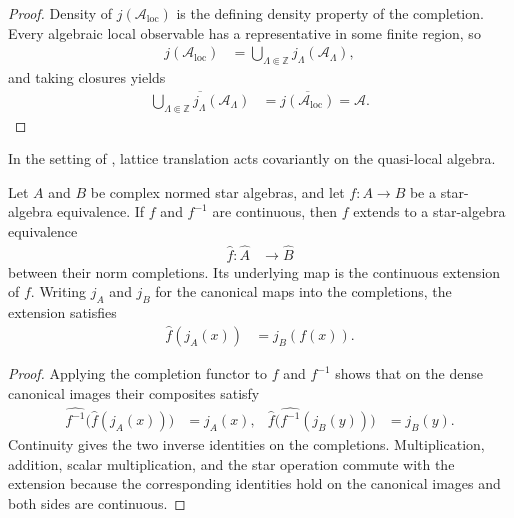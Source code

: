 \begin{proof}\leanok
    Density of $j(\mathcal A_{\mathrm{loc}})$ is the defining density property
    of the completion.  Every algebraic local observable has a representative
    in some finite region, so
    \begin{align}
        j(\mathcal A_{\mathrm{loc}})
         & =\bigcup_{\Lambda\Subset\mathbb Z}j_\Lambda(\mathcal A_\Lambda),
    \end{align}
    and taking closures yields
    \begin{align}
        \overline{\bigcup_{\Lambda\Subset\mathbb Z} j_\Lambda(\mathcal A_\Lambda)}
         & = \overline{j(\mathcal A_{\mathrm{loc}})} = \mathcal A.
    \end{align}
\end{proof}

In the setting of \cite[lines~2292--2306]{Cirac2017MPU}, lattice translation acts covariantly on the quasi-local
algebra.

\begin{definition}
    \label{def:completion_star_alg_equiv}
    \leanok
    Let $A$ and $B$ be complex normed star algebras, and let
    $f\colon A\to B$ be a star-algebra equivalence.  If $f$ and $f^{-1}$ are
    continuous, then $f$ extends to a star-algebra equivalence
    \begin{align}
        \widehat f\colon\widehat A & \longrightarrow\widehat B
    \end{align}
    between their norm completions.  Its underlying map is the continuous
    extension of $f$.  Writing $j_A$ and $j_B$ for the canonical maps into the
    completions, the extension satisfies
    \begin{align}
        \widehat f(j_A(x)) & =j_B(f(x)).
    \end{align}
\end{definition}

\begin{proof}\leanok
    Applying the completion functor to $f$ and $f^{-1}$ shows that on the dense canonical
    images their composites satisfy
    \begin{align}
        \widehat{f^{-1}}\bigl(\widehat f(j_A(x))\bigr) & =j_A(x), &
        \widehat f\bigl(\widehat{f^{-1}}(j_B(y))\bigr) & =j_B(y).
    \end{align}
    Continuity gives the two inverse identities on the completions.
    Multiplication, addition, scalar multiplication, and the star operation
    commute with the extension because the corresponding identities hold on
    the canonical images and both sides are continuous.
\end{proof}

